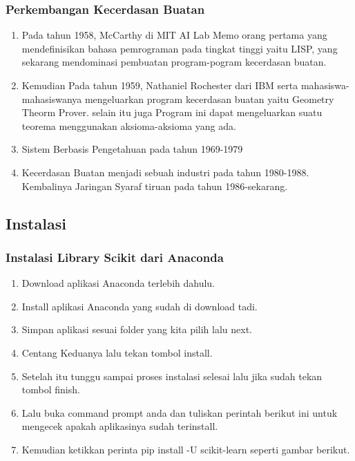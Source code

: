            \subsubsection{Perkembangan Kecerdasan Buatan}
            \begin{enumerate}
                \item Pada tahun 1958, McCarthy di MIT AI Lab Memo orang pertama yang mendefinisikan bahasa pemrograman pada tingkat tinggi yaitu LISP, yang sekarang mendominasi pembuatan program-pogram kecerdasan buatan.
                \item Kemudian Pada tahun 1959, Nathaniel Rochester dari IBM serta mahasiswa-mahasiswanya mengeluarkan program kecerdasan buatan yaitu Geometry Theorm Prover. selain itu juga Program ini dapat mengeluarkan suatu teorema menggunakan aksioma-aksioma yang ada.
                \item Sistem Berbasis Pengetahuan pada tahun 1969-1979
                \item  Kecerdasan Buatan menjadi sebuah industri pada tahun 1980-1988. Kembalinya Jaringan Syaraf tiruan pada tahun 1986-sekarang.
            \end{enumerate}
        \subsection{Instalasi}
            \subsubsection{Instalasi Library Scikit dari Anaconda}
            \begin{enumerate}
                \item Download aplikasi Anaconda terlebih dahulu. 
                \item Install aplikasi Anaconda yang sudah di download tadi. 
                \item Simpan aplikasi sesuai folder yang kita pilih lalu next. 
                \item Centang Keduanya lalu tekan tombol install. 
                \item Setelah itu tunggu sampai proses instalasi selesai lalu jika sudah tekan tombol finish. 
                \item Lalu buka command prompt anda dan tuliskan perintah berikut ini untuk mengecek apakah aplikasinya sudah   terinstall. 
                \item Kemudian ketikkan perinta pip install -U scikit-learn seperti gambar berikut. 
            \end{enumerate}

